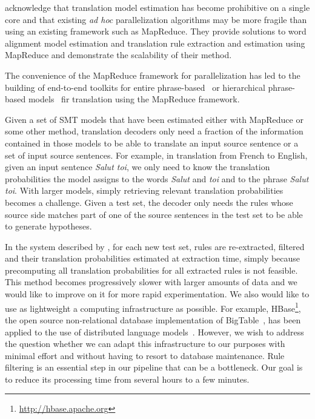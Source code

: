 \citet{dyer-cordova-mont-lin:2008:WMT}
acknowledge that translation model estimation has become prohibitive
on a single core and that existing \emph{ad hoc} parallelization
algorithms may be more fragile than using an existing framework such
as MapReduce. They provide solutions to word alignment model
estimation and translation rule extraction and estimation using MapReduce
and demonstrate the scalability of their method.

The convenience
of the MapReduce framework for parallelization has led to the building
of end-to-end toolkits for entire phrase-based~\citep{gao-vogel:2010:PBML} or
hierarchical phrase-based models~\citep{venugopal-zollmann:2009:PBML}
fir translation using the MapReduce framework.

Given a set of SMT models that have been estimated either with MapReduce
or some other method, translation decoders only need a fraction of the information
contained in those models to be able to translate an input source sentence or a
set of input source sentences. For example, in translation from French to
English, given an input sentence \emph{Salut toi}, we only need to know the
translation probabilities the model assigns to the words \emph{Salut} and
\emph{toi} and to the phrase \emph{Salut toi}.
With larger models, simply retrieving relevant translation
probabilities becomes a challenge. Given a test set, the decoder
only needs the rules whose source side matches part of one of the source
sentences in the test set to be able to generate hypotheses.

In the system
described by \citet{iglesias-degispert-banga-byrne:2009:NAACL}, for each
new test set, rules are re-extracted, filtered and their
translation probabilities estimated at extraction time, simply
because precomputing all translation probabilities for all extracted
rules is not feasible. This
method becomes progressively slower with larger amounts of data and we
would like to improve on it for more rapid experimentation. We also would like
to use as lightweight a computing infrastructure as possible. For example,
HBase\footnote{\url{http://hbase.apache.org}}, the open source non-relational database
implementation of
BigTable~\citep{chang-dean-ghemawat-hsieh-wallach-burrows-chandra-fikes-gruber:2008:ACM}, has been applied to the use of distributed language
models~\citep{yu:2008:mastersthesis}. However, we wish to address the question
whether we can adapt this infrastructure to our purposes with minimal
effort and without having to resort to database maintenance.
Rule filtering is an essential step in our pipeline that can be a
bottleneck. Our goal is to reduce its processing time from several hours to a
few minutes.

